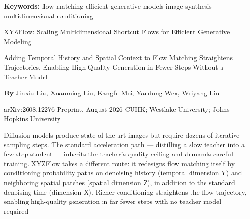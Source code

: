 \documentclass[10pt,twocolumn]{article}
\begin{document}
\setlength{\parindent}{0pt}
\setlength{\parskip}{4pt}

{\small\color{keywordgray}\textbf{Keywords:}
  flow matching \textbullet{}
  efficient generative models \textbullet{}
  image synthesis \textbullet{}
  multidimensional conditioning}\par\vspace{4pt}

{\LARGE\bfseries\raggedright
  XYZFlow: Scaling Multidimensional Shortcut
  Flows for Efficient Generative Modeling}\par\vspace{4pt}

{\large\itshape\raggedright
  Adding Temporal History and Spatial Context to Flow Matching
  Straightens Trajectories, Enabling High-Quality Generation
  in Fewer Steps Without a Teacher Model}\par\vspace{6pt}

{\small\textbf{By} Jinxiu Liu, Xuanming Liu, Kangfu Mei,
  Yandong Wen, Weiyang Liu}\par\vspace{2pt}

{\small\color{keywordgray}arXiv:2608.12276 \textbullet{} Preprint, August 2026 \textbullet{}
  CUHK; Westlake University; Johns Hopkins University}
\par\vspace{2pt}\noindent{\color{rulered}\rule{\columnwidth}{0.6pt}}\vspace{6pt}

Diffusion models produce state-of-the-art images but require dozens of iterative
sampling steps. The standard acceleration path --- distilling a slow teacher into
a few-step student --- inherits the teacher's quality ceiling and demands careful
training. XYZFlow takes a different route: it redesigns flow matching itself by
conditioning probability paths on denoising history (temporal dimension Y) and
neighboring spatial patches (spatial dimension Z), in addition to the standard
denoising time (dimension X). Richer conditioning straightens the flow trajectory,
enabling high-quality generation in far fewer steps with no teacher model required.
\end{document}
